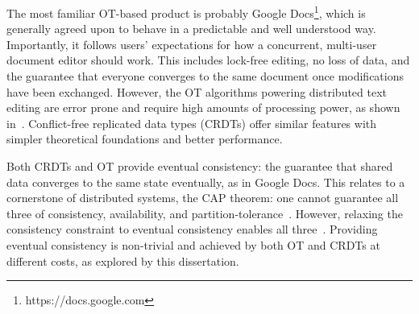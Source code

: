 \documentclass[12pt,a4paper,twoside,openright]{report}
\begin{document}
The most familiar OT-based product is probably Google Docs\footnote{https://docs.google.com}, which is generally agreed upon to behave in a predictable and well understood way. Importantly, it follows users' expectations for how a concurrent, multi-user document editor should work. This includes lock-free editing, no loss of data, and the guarantee that everyone converges to the same document once modifications have been exchanged. However, the OT algorithms powering distributed text editing are error prone and require high amounts of processing power, as shown in~\cite{dang2016performance}. Conflict-free replicated data types (CRDTs) offer similar features with simpler theoretical foundations and better performance.

Both CRDTs and OT provide eventual consistency: the guarantee that shared data converges to the same state eventually, as in Google Docs. This relates to a cornerstone of distributed systems, the CAP theorem: one cannot guarantee all three of consistency, availability, and partition-tolerance~\cite{Gilbert2005}. However, relaxing the consistency constraint to eventual consistency enables all three~\cite{zeller2014}. Providing eventual consistency is non-trivial and achieved by both OT and CRDTs at different costs, as explored by this dissertation.





\end{document}
